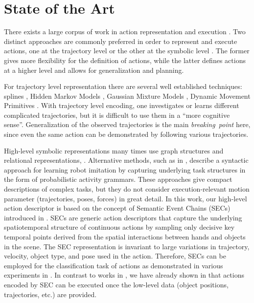  
  

\clearpage  %
\section{State of the Art}
\label{sec:soa}

There exists a large corpus of work in action representation and execution \cite{Ijspeert2002,Ude93,Lee2006,Calinon2007}. Two distinct approaches are commonly preferred in order to represent and execute actions, one at the trajectory level \cite{Ijspeert2002} or the other at the symbolic level \cite{Dillmann2010}.
The former gives more flexibility for the definition of actions, while the latter defines actions at a higher level and allows for generalization and planning.

For trajectory level representation there are several well established techniques: splines \cite{Ude93}, Hidden Markov Models \cite{Lee2006}, Gaussian Mixture Models \cite{Calinon2007}, Dynamic Movement Primitives  \cite{Ijspeert2002,Luksch12}.
With trajectory level encoding, one investigates or learns different complicated trajectories, but it is difficult to use them in a ``more cognitive sense''. Generalization of the observed trajectories is the main {\it breaking~point} here, since even the same action can be demonstrated by following various trajectories.

High-level symbolic representations many times use graph structures and relational representations,
\eg \cite{Pardowitz2007,Ekvall2006,Aksoy2011}. Alternative methods, such as in \cite{Lee2013}, describe a syntactic approach for learning robot imitation by capturing  underlying task structures in the form of probabilistic activity grammars. 
These approaches give compact descriptions of complex tasks,
but they do not consider execution-relevant motion parameter (trajectories, poses, forces) in great detail.
In this work, our high-level action descriptor is based on the concept of Semantic Event Chains (SECs) introduced in  \cite{Aksoy2011}. 
SECs are generic action descriptors that capture the underlying spatiotemporal structure of continuous actions by sampling only
decisive key temporal points derived from the spatial interactions between hands and objects in the scene. The
SEC representation is invariant to large variations in trajectory, velocity, object type, and pose used in the action. 
Therefore, SECs can be employed for the classification task of actions as demonstrated in various experiments in  \cite{Aksoy2010,Aksoy2011,Aksoy2011b,Aksoy2013,AksoyRAS2014}. 
In contrast to works in  \cite{Pardowitz2007,Ekvall2006}, we have already shown in \cite{Aksoy2011b} that actions encoded by SEC can be executed once the low-level data (object positions, trajectories, etc.) are provided. 


